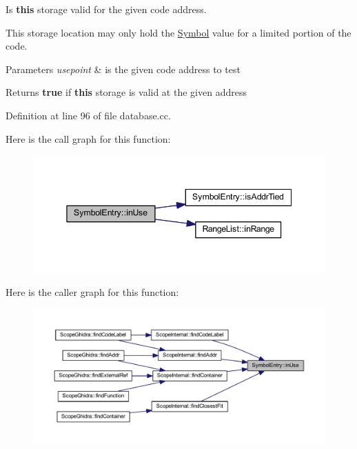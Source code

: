 Is {\bfseries{this}} storage valid for the given code address. 

This storage location may only hold the \mbox{\hyperlink{class_symbol}{Symbol}} value for a limited portion of the code. 
\begin{DoxyParams}{Parameters}
{\em usepoint} & is the given code address to test \\
\hline
\end{DoxyParams}
\begin{DoxyReturn}{Returns}
{\bfseries{true}} if {\bfseries{this}} storage is valid at the given address 
\end{DoxyReturn}


Definition at line 96 of file database.\+cc.

Here is the call graph for this function\+:
\nopagebreak
\begin{figure}[H]
\begin{center}
\leavevmode
\includegraphics[width=345pt]{class_symbol_entry_a389ffcfb36cee3c49b63fdac6be92bee_cgraph}
\end{center}
\end{figure}
Here is the caller graph for this function\+:
\nopagebreak
\begin{figure}[H]
\begin{center}
\leavevmode
\includegraphics[width=350pt]{class_symbol_entry_a389ffcfb36cee3c49b63fdac6be92bee_icgraph}
\end{center}
\end{figure}
\mbox{\label{class_symbol_entry_a8e2a7fd30276da3672340e5424aadad9}} 
